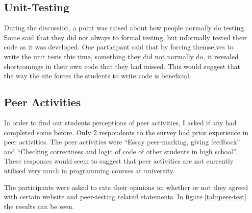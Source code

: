 \documentclass[a4paper,11pt]{report}
\begin{document}
\subsection{Unit-Testing}
During the discussion, a point was raised about how people normally do testing. Some said that they did not always to formal testing, but informally tested their code as it was developed. One participant said that by forcing themselves to write the unit tests this time, something they did not normally do, it revealed shortcomings in their own code that they had missed. This would suggest that the way the site forces the students to write code is beneficial.
\subsection{Peer Activities}
In order to find out students perceptions of peer activities, I asked if any had completed some before. Only 2 respondents to the survey had prior experience in peer activities. The peer activities were ``Essay peer-marking, giving feedback'' and ``Checking correctness and logic of code of other students in high school''. These responses would seem to suggest that peer activities are not currently utilised very much in programming courses at university.\par
The participants were asked to rate their opinions on whether or not they agreed with certain website and peer-testing related statements. In figure \ref{tab:peer-test} the results can be seen.\\
\end{document}
